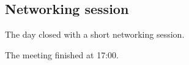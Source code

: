 \subsection{Networking session}
The day closed with a short networking session.

The meeting finished at 17:00.